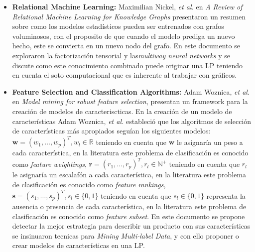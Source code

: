\begin{itemize}
\item {\textbf{Relational Machine Learning:}}
Maximilian Nickel, \textit{et al.} en \textit{A Review of Relational Machine Learning for Knowledge Graphs}\cite{Nickel2015} presentaron un resumen sobre como los modelos estadísticos pueden ser entrenados con grafos voluminosos, con el proposito de que cuando el modelo prediga un nuevo hecho, este se convierta en un nuevo nodo del grafo. En este documento se exploraron la factorización tensorial y las\textit{multiway neural networks} y se discute como este conocimiento combinado puede originar una LP teniendo en cuenta el soto computacional que es inherente al trabajar con gráficos.

\item {\textbf{Feature Selection and Classification Algorithms:}}
Adam Woznica, \textit{et al.} en \textit{Model mining for robust feature selection}\cite{Woznica2012}, presentan un framework para la creación de modelos de caracteriscticas. En la  creación de un modelo de características Adam Woznica, \textit{et al.} estableció que los algoritmos de selección de características más apropiados seguían los siguientes modelos: $\mathbf{w}=(w_{1},…,w_{p})^{T}, w_{l}\in \mathbb{R} $ teniendo en cuenta que $\mathbf{w}$ le asignaría un peso a cada característica, en la literatura este problema de clasificación es conocido como \textit{feature weightings}, $\mathbf{r}=(r_{1},…,r_{p})^{T}, r_{l}\in \mathbb{N}^{+} $ teniendo en cuenta que $r_{l}$ le asignaría un escalafón a cada característica, en la literatura este problema de clasificación es conocido como \textit{feature rankings}, $\mathbf{s}=(s_{1},…,s_{p})^{T}, s_{l}\in \{0,1\} $ teniendo en cuenta que $s_{l}\in \{0,1\}$ representa la ausencia o presencia de cada característica, en la literatura este problema de clasificación es conocido como \textit{feature subset}. En este documento se propone detectar la mejor estrategia para describir un producto con sus características se insinuaron tecnicas para \textit{Mining Multi-label Data}, y  con ello proponer o crear modelos de características en una LP. 


\end{itemize}

